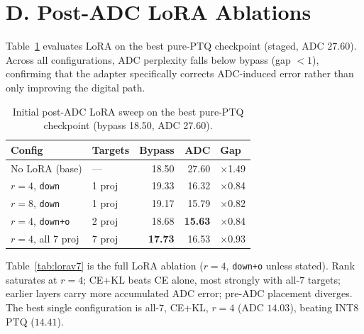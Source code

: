 \documentclass[letterpaper]{article} %
\theoremstyle{plain}
\begin{document}
\section{D. Post-ADC LoRA Ablations}

Table~\ref{tab:lorav6} evaluates LoRA on the best pure-PTQ checkpoint (staged, ADC $27.60$). Across all configurations, ADC perplexity falls below bypass (gap $<1$), confirming that the adapter specifically corrects ADC-induced error rather than only improving the digital path.

\begin{table}[htbp]
\centering
\begin{tabular}{@{}llrrl@{}}
\toprule
\textbf{Config} & \textbf{Targets} & \textbf{Bypass} & \textbf{ADC} & \textbf{Gap} \\
\midrule
No LoRA (base)      & ---    & 18.50 & 27.60 & $\times$1.49 \\
$r=4$, \texttt{down}    & 1 proj & 19.33 & 16.32 & $\times$0.84 \\
$r=8$, \texttt{down}    & 1 proj & 19.17 & 15.79 & $\times$0.82 \\
$r=4$, \texttt{down+o}  & 2 proj & 18.68 & \textbf{15.63} & $\times$0.84 \\
$r=4$, all 7 proj   & 7 proj & \textbf{17.73} & 16.53 & $\times$0.93 \\
\bottomrule
\end{tabular}
\caption{Initial post-ADC LoRA sweep on the best pure-PTQ checkpoint (bypass 18.50, ADC 27.60).}
\label{tab:lorav6}
\end{table}

Table~\ref{tab:lorav7} is the full LoRA ablation ($r=4$, \texttt{down+o} unless stated). Rank saturates at $r=4$; CE+KL beats CE alone, most strongly with all-$7$ targets; earlier layers carry more accumulated ADC error; pre-ADC placement diverges. The best single configuration is all-$7$, CE+KL, $r=4$ (ADC $14.03$), beating INT8 PTQ ($14.41$).
\end{document}

